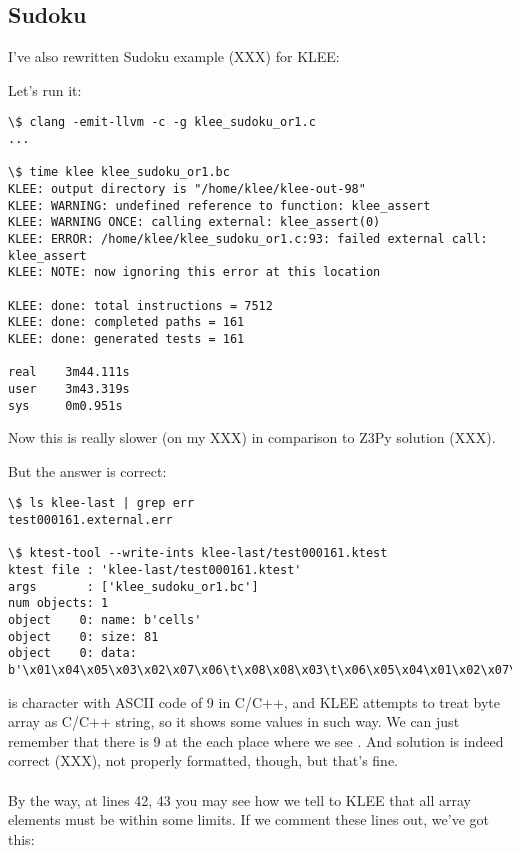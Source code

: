 \subsection{Sudoku}

I've also rewritten Sudoku example (XXX) for KLEE: %



Let's run it:

\begin{lstlisting}
\$ clang -emit-llvm -c -g klee_sudoku_or1.c
...

\$ time klee klee_sudoku_or1.bc
KLEE: output directory is "/home/klee/klee-out-98"
KLEE: WARNING: undefined reference to function: klee_assert
KLEE: WARNING ONCE: calling external: klee_assert(0)
KLEE: ERROR: /home/klee/klee_sudoku_or1.c:93: failed external call: klee_assert
KLEE: NOTE: now ignoring this error at this location

KLEE: done: total instructions = 7512
KLEE: done: completed paths = 161
KLEE: done: generated tests = 161

real    3m44.111s
user    3m43.319s
sys     0m0.951s
\end{lstlisting}

Now this is really slower (on my XXX) in comparison to Z3Py solution (XXX). %

But the answer is correct:

\begin{lstlisting}
\$ ls klee-last | grep err
test000161.external.err

\$ ktest-tool --write-ints klee-last/test000161.ktest
ktest file : 'klee-last/test000161.ktest'
args       : ['klee_sudoku_or1.bc']
num objects: 1
object    0: name: b'cells'
object    0: size: 81
object    0: data: b'\x01\x04\x05\x03\x02\x07\x06\t\x08\x08\x03\t\x06\x05\x04\x01\x02\x07\x06\x07\x02\t\x01\x08\x05\x04\x03\x04\t\x06\x01\x08\x05\x03\x07\x02\x02\x01\x08\x04\x07\x03\t\x05\x06\x07\x05\x03\x02\t\x06\x04\x08\x01\x03\x06\x07\x05\x04\x02\x08\x01\t\t\x08\x04\x07\x06\x01\x02\x03\x05\x05\x02\x01\x08\x03\t\x07\x06\x04'
\end{lstlisting}

\TT{\\t} is character with ASCII code of 9 in C/C++, and KLEE attempts to treat byte array as C/C++ string, so it shows some values in such way.
We can just remember that there is 9 at the each place where we see \TT{\\t}.
And solution is indeed correct (XXX), not properly formatted, though, but that's fine.\\ %
\\
By the way, at lines 42, 43 you may see how we tell to KLEE that all array elements must be within some limits.
If we comment these lines out, we've got this:

